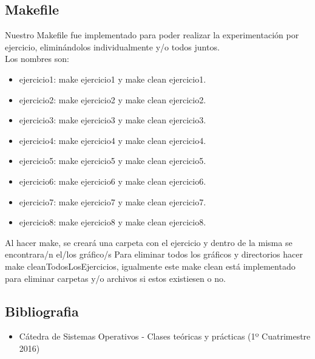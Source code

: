 
\subsection{Makefile}

Nuestro Makefile fue implementado para poder realizar la experimentaci\'on por ejercicio, elimin\'{a}ndolos individualmente y/o todos juntos.\\
Los nombres son:\\
\begin{itemize}
 \item ejercicio1: make ejercicio1 y make clean ejercicio1.
 \item ejercicio2: make ejercicio2 y make clean ejercicio2.
 \item ejercicio3: make ejercicio3 y make clean ejercicio3.
 \item ejercicio4: make ejercicio4 y make clean ejercicio4.
 \item ejercicio5: make ejercicio5 y make clean ejercicio5.
 \item ejercicio6: make ejercicio6 y make clean ejercicio6.
 \item ejercicio7: make ejercicio7 y make clean ejercicio7.
 \item ejercicio8: make ejercicio8 y make clean ejercicio8.
\end{itemize}

Al hacer make, se crear\'a una carpeta con el ejercicio y dentro de la misma se encontrara/n el/los gr\'afico/s
Para eliminar todos los gr\'aficos y directorios hacer make cleanTodosLosEjercicios, igualmente este make clean est\'a implementado
para eliminar carpetas y/o archivos si estos existiesen o no.\\

\subsection{Bibliografia}

\begin{itemize}
 \item C\'atedra de Sistemas Operativos - Clases te\'oricas y pr\'acticas (1º Cuatrimestre 2016)
 \end{itemize}
